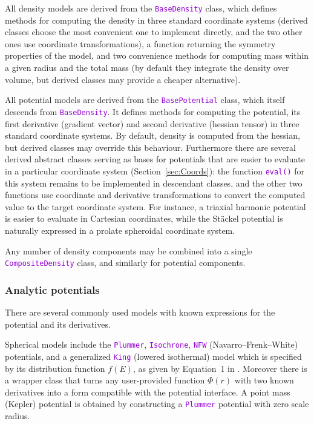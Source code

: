 \documentclass[12pt]{article}
\newcommand{\ttt}[1]{\textcolor{darkviolet}{\texttt{#1}}}
\begin{document}
All density models are derived from the \ttt{BaseDensity} class, which defines methods for computing the density in three standard coordinate systems (derived classes choose the most convenient one to implement directly, and the two other ones use coordinate transformations), a function returning the symmetry properties of the model, and two convenience methods for computing mass within a given radius and the total mass (by default they integrate the density over volume, but derived classes may provide a cheaper alternative).

All potential models are derived from the \ttt{BasePotential} class, which itself descends from \ttt{BaseDensity}. It defines methods for computing the potential, its first derivative (gradient vector) and second derivative (hessian tensor) in three standard coordinate systems. By default, density is computed from the hessian, but derived classes may override this behaviour.
Furthermore there are several derived abstract classes serving as bases for potentials that are easier to evaluate in a particular coordinate system (Section~\ref{sec:Coords}): the function \ttt{eval()} for this system remains to be implemented in descendant classes, and the other two functions use coordinate and derivative transformations to convert the computed value to the target coordinate system.
For instance, a triaxial harmonic potential is easier to evaluate in Cartesian coordinates, while the St\"ackel potential is naturally expressed in a prolate spheroidal coordinate system.

Any number of density components may be combined into a single \ttt{CompositeDensity} class, and similarly for potential components.

\subsubsection{Analytic potentials}  \label{sec:PotentialAnalytic}

There are several commonly used models with known expressions for the potential and its derivatives. 

Spherical models include the \ttt{Plummer}, \ttt{Isochrone}, \ttt{NFW} (Navarro--Frenk--White) potentials, and a generalized \ttt{King} (lowered isothermal) model which is specified by its distribution function $f(E)$, as given by Equation~1 in \cite{GielesZocchi2015}.
Moreover there is a wrapper class that turns any user-provided function $\Phi(r)$ with two known derivatives into a form compatible with the potential interface. A point mass (Kepler) potential is obtained by constructing a \ttt{Plummer} potential with zero scale radius.
\end{document}
